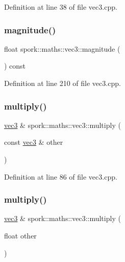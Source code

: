 Definition at line 38 of file vec3.\+cpp.

\mbox{\label{structspork_1_1maths_1_1vec3_a6182e62de893da8a75430d69a43c3799}} 
\subsubsection{\texorpdfstring{magnitude()}{magnitude()}}
{\footnotesize\ttfamily float spork\+::maths\+::vec3\+::magnitude (\begin{DoxyParamCaption}{ }\end{DoxyParamCaption}) const}



Definition at line 210 of file vec3.\+cpp.

\mbox{\label{structspork_1_1maths_1_1vec3_ad4cbb6857f71f0cda66f6a1f3d794c6b}} 
\subsubsection{\texorpdfstring{multiply()}{multiply()}\hspace{0.1cm}{\footnotesize\ttfamily [1/2]}}
{\footnotesize\ttfamily \hyperlink{structspork_1_1maths_1_1vec3}{vec3} \& spork\+::maths\+::vec3\+::multiply (\begin{DoxyParamCaption}\item[{const \hyperlink{structspork_1_1maths_1_1vec3}{vec3} \&}]{other }\end{DoxyParamCaption})}



Definition at line 86 of file vec3.\+cpp.

\mbox{\label{structspork_1_1maths_1_1vec3_a8e0548e67ce8bbc8487e9d8a8b140dec}} 
\subsubsection{\texorpdfstring{multiply()}{multiply()}\hspace{0.1cm}{\footnotesize\ttfamily [2/2]}}
{\footnotesize\ttfamily \hyperlink{structspork_1_1maths_1_1vec3}{vec3} \& spork\+::maths\+::vec3\+::multiply (\begin{DoxyParamCaption}\item[{float}]{other }\end{DoxyParamCaption})}



